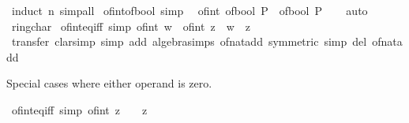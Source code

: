 \begin{isabellebody}
%
\isatagproof
{}\isamarkupfalse%
\ {\isacharparenleft}{\kern0pt}induct\ n{\isacharparenright}{\kern0pt}\ simp{\isacharunderscore}{\kern0pt}all%
\endisatagproof
{\isafoldproof}%
%
\isadelimproof
\isanewline
%
\endisadelimproof
\isanewline
{}\isamarkupfalse%
\ of{\isacharunderscore}{\kern0pt}int{\isacharunderscore}{\kern0pt}of{\isacharunderscore}{\kern0pt}bool\ {\isacharbrackleft}{\kern0pt}simp{\isacharbrackright}{\kern0pt}{\isacharcolon}{\kern0pt}\isanewline
\ \ {\isachardoublequoteopen}of{\isacharunderscore}{\kern0pt}int\ {\isacharparenleft}{\kern0pt}of{\isacharunderscore}{\kern0pt}bool\ P{\isacharparenright}{\kern0pt}\ {\isacharequal}{\kern0pt}\ of{\isacharunderscore}{\kern0pt}bool\ P{\isachardoublequoteclose}\isanewline
%
\isadelimproof
\ \ %
\endisadelimproof
%
\isatagproof
{}\isamarkupfalse%
\ auto%
\endisatagproof
{\isafoldproof}%
%
\isadelimproof
\isanewline
%
\endisadelimproof
\isanewline
{}\isamarkupfalse%
\isanewline
\isanewline
{}\isamarkupfalse%
\ ring{\isacharunderscore}{\kern0pt}char{\isacharunderscore}{\kern0pt}{}\isanewline
{}\isanewline
\isanewline
{}\isamarkupfalse%
\ of{\isacharunderscore}{\kern0pt}int{\isacharunderscore}{\kern0pt}eq{\isacharunderscore}{\kern0pt}iff\ {\isacharbrackleft}{\kern0pt}simp{\isacharbrackright}{\kern0pt}{\isacharcolon}{\kern0pt}\ {\isachardoublequoteopen}of{\isacharunderscore}{\kern0pt}int\ w\ {\isacharequal}{\kern0pt}\ of{\isacharunderscore}{\kern0pt}int\ z\ {\isasymlongleftrightarrow}\ w\ {\isacharequal}{\kern0pt}\ z{\isachardoublequoteclose}\isanewline
%
\isadelimproof
\ \ %
\endisadelimproof
%
\isatagproof
{}\isamarkupfalse%
\ transfer\ {\isacharparenleft}{\kern0pt}clarsimp\ simp\ add{\isacharcolon}{\kern0pt}\ algebra{\isacharunderscore}{\kern0pt}simps\ of{\isacharunderscore}{\kern0pt}nat{\isacharunderscore}{\kern0pt}add\ {\isacharbrackleft}{\kern0pt}symmetric{\isacharbrackright}{\kern0pt}\ simp\ del{\isacharcolon}{\kern0pt}\ of{\isacharunderscore}{\kern0pt}nat{\isacharunderscore}{\kern0pt}add{\isacharparenright}{\kern0pt}%
\endisatagproof
{\isafoldproof}%
%
\isadelimproof
%
\endisadelimproof
%
\begin{isamarkuptext}%
Special cases where either operand is zero.%
\end{isamarkuptext}\isamarkuptrue%
\isamarkupfalse%
\ of{\isacharunderscore}{\kern0pt}int{\isacharunderscore}{\kern0pt}eq{\isacharunderscore}{\kern0pt}{}{\isacharunderscore}{\kern0pt}iff\ {\isacharbrackleft}{\kern0pt}simp{\isacharbrackright}{\kern0pt}{\isacharcolon}{\kern0pt}\ {\isachardoublequoteopen}of{\isacharunderscore}{\kern0pt}int\ z\ {\isacharequal}{\kern0pt}\ {}\ {\isasymlongleftrightarrow}\ z\ {\isacharequal}{\kern0pt}\ {}{\isachardoublequoteclose}\isanewline

\end{isabellebody}
